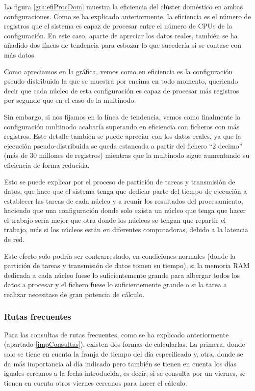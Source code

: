 La figura \ref{gra:efiProcDom} muestra la eficiencia del clúster doméstico en ambas configuraciones. Como se ha explicado anteriormente, la eficiencia es el número de registros que el sistema es capaz de procesar entre el número de \gls{CPU}s de la configuración. En este caso, aparte de apreciar los datos reales, también se ha añadido dos líneas de tendencia para esbozar lo que sucedería si se contase con más datos.

Como apreciamos en la gráfica, vemos como en eficiencia es la configuración pseudo-distribuida la que se muestra por encima en todo momento, queriendo decir que cada núcleo de esta configuración es capaz de procesar más registros por segundo que en el caso de la multinodo. 

Sin embargo, si nos fijamos en la línea de tendencia, vemos como finalmente la configuración multinodo acabaría superando en eficiencia con ficheros con más registros. Este detalle también se puede apreciar con los datos reales, ya que la ejecución pseudo-distribuida se queda estancada a partir del fichero ``2 decimo'' (más de 30 millones de registros) mientras que la multinodo sigue aumentando su eficiencia de forma reducida.

Esto se puede explicar por el proceso de partición de tareas y transmisión de datos, que hace que el sistema tenga que dedicar parte del tiempo de ejecución a establecer las tareas de cada núcleo y a reunir los resultados del procesamiento, haciendo que una configuración donde solo exista un núcleo que tenga que hacer el trabajo sería mejor que otra donde los núcleos se tengan que repartir el trabajo, más si los núcleos están en diferentes computadoras, debido a la latencia de red.

Este efecto solo podría ser contrarrestado, en condiciones normales (donde la partición de tareas y transmisión de datos tomen su tiempo), si la memoria \gls{RAM} dedicada a cada núcleo fuese lo suficientemente grande para albergar todos los datos a procesar y el fichero fuese lo suficientemente grande o si la tarea a realizar necesitase de gran potencia de cálculo.

\subsubsection{Rutas frecuentes}
Para las consultas de rutas frecuentes, como se ha explicado anteriormente (apartado \ref{impConsultas}), existen dos formas de calcularlas. La primera, donde solo se tiene en cuenta la franja de tiempo del día especificado y, otra, donde se da más importancia al día indicado pero también se tienen en cuenta los días iguales cercanos a la fecha introducida, es decir, si se consulta por un viernes, se tienen en cuenta otros viernes cercanos para hacer el cálculo.

